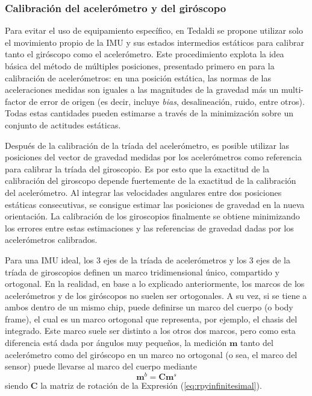 \subsubsection{Calibración del acelerómetro y del giróscopo}
Para evitar el uso de equipamiento específico, en Tedaldi \cite{tedaldi2014} se propone utilizar solo el movimiento propio de la IMU y sus estados intermedios estáticos para calibrar tanto el giróscopo como el acelerómetro. Este procedimiento explota la idea básica del método de múltiples posiciones, presentado primero en \cite{lotters1998} para la calibración de acelerómetros: en una posición estática, las normas de las aceleraciones medidas son iguales a las magnitudes de la gravedad más un multi-factor de error de origen (es decir, incluye \textit{bias}, desalineación, ruido, entre otros). Todas estas cantidades pueden estimarse a través de la minimización sobre un conjunto de actitudes estáticas. 

Después de la calibración de la tríada del acelerómetro, es posible utilizar las posiciones del vector de gravedad medidas por los acelerómetros como referencia para calibrar la tríada del giroscopio. Es por esto que la exactitud de la calibración del giroscopo depende fuertemente de la exactitud de la calibración del acelerómetro. Al integrar las velocidades angulares entre dos posiciones estáticas consecutivas, se consigue estimar las posiciones de gravedad en la nueva orientación. La calibración de los giroscopios finalmente se obtiene minimizando los errores entre estas estimaciones y las referencias de gravedad dadas por los acelerómetros calibrados.

Para una IMU ideal, los 3 ejes de la tríada de acelerómetros y los 3 ejes de la tríada de giroscopios definen un marco tridimensional único, compartido y ortogonal. En la realidad, en base a lo explicado anteriormente, los marcos de los acelerómetros y de los giróscopos no suelen ser ortogonales. A su vez, si se tiene a ambos dentro de un mismo chip, puede definirse un marco del cuerpo (o body frame), el cual es un marco ortogonal que representa, por ejemplo, el chasis del integrado. Este marco suele ser distinto a los otros dos marcos, pero como esta diferencia está dada por ángulos muy pequeños, la medición $\bm{m}$ tanto del acelerómetro como del giróscopo en un marco no ortogonal (o sea, el marco del sensor) puede llevarse al marco del cuerpo mediante
\begin{equation}
    \bm{m}^b = \bm{C}\bm{m}^s
\end{equation}
siendo $\bm{C}$ la matriz de rotación de la Expresión (\ref{eq:rpyinfinitesimal}).

